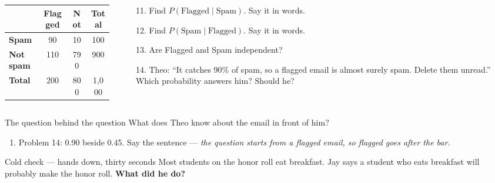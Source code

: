 \documentclass[aspectratio=169, 11pt]{beamer}
\begin{document}
\begin{frame}[t, plain]
  \begin{columns}[t]
    \begin{column}{0.42\textwidth}
      \renewcommand{\arraystretch}{1.3}
      {\small
      \begin{tabular}{l c c c}
      \hline
       & \textbf{Flagged} & \textbf{Not} & \textbf{Total} \\
      \hline
      \textbf{Spam} & 90 & 10 & 100 \\
      \textbf{Not spam} & 110 & 790 & 900 \\
      \textbf{Total} & 200 & 800 & 1,000 \\
      \hline
      \end{tabular}}
    \end{column}
    \begin{column}{0.55\textwidth}
      \begin{itemize}\setlength{\itemsep}{4pt}
        \item[11.] Find $P(\text{Flagged} \mid \text{Spam})$. Say it in words.
        \item[12.] Find $P(\text{Spam} \mid \text{Flagged})$. Say it in words.
        \item[13.] Are Flagged and Spam independent?
        \item[14.] Theo: ``It catches 90\% of spam, so a flagged email is almost surely spam.
              Delete them unread.'' Which probability answers him? Should he?
      \end{itemize}
    \end{column}
  \end{columns}
  \begin{block}{The question behind the question}
    What does Theo know about the email in front of him?
  \end{block}
\end{frame}

\begin{frame}[t, plain]
  \vspace{4pt}
  \begin{enumerate}\setlength{\itemsep}{5pt}
    \item Problem 14: 0.90 beside 0.45. Say the sentence --- \emph{the question starts from a
          flagged email, so flagged goes after the bar.}
  \end{enumerate}
  \vspace{6pt}
  \begin{block}{Cold check --- hands down, thirty seconds}
    Most students on the honor roll eat breakfast. Jay says a student who eats breakfast will
    probably make the honor roll. \textbf{What did he do?}
  \end{block}
\end{frame}
\end{document}
